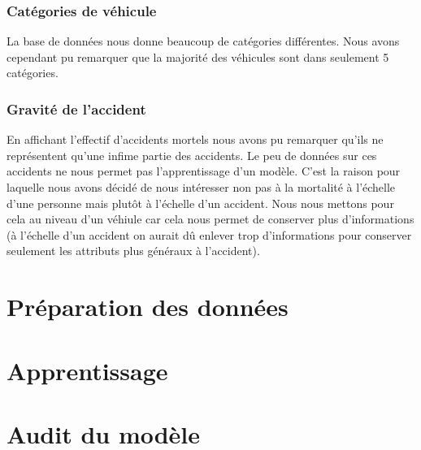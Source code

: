 \documentclass[]{article}
\begin{document}
    \subsubsection{Catégories de véhicule}
    La base de données nous donne beaucoup de catégories différentes. Nous avons cependant pu remarquer 
    que la majorité des véhicules sont dans seulement 5 catégories.

    \subsubsection{Gravité de l'accident}
    En affichant l'effectif d'accidents mortels nous avons pu remarquer qu'ils ne représentent qu'une 
    infime partie des accidents. Le peu de données sur ces accidents ne nous permet pas l'apprentissage 
    d'un modèle. C'est la raison pour laquelle nous avons décidé de nous intéresser non pas à la mortalité 
    à l'échelle d'une personne mais plutôt à l'échelle d'un accident. Nous nous mettons pour cela au niveau d'un 
    véhiule car cela nous permet de conserver plus d'informations (à l'échelle d'un accident on aurait 
    dû enlever trop d'informations pour conserver seulement les attributs plus généraux à l'accident).

    \section{Préparation des données}

    \section{Apprentissage}

    \section{Audit du modèle}
\end{document}
